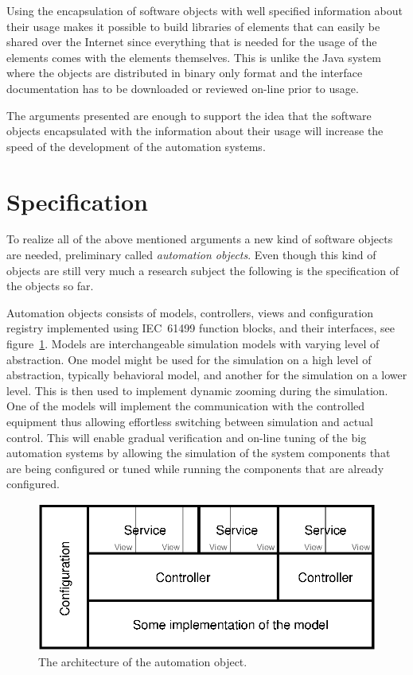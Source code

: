 Using the encapsulation of software objects with well
specified information about their usage makes it possible to
build libraries of elements that can easily be shared over
the Internet since everything that is needed for the usage
of the elements comes with the elements themselves. This is
unlike the Java system where the objects are distributed in
binary only format and the interface documentation has to be
downloaded or reviewed on-line prior to usage.

The arguments presented are enough to support the idea that
the software objects encapsulated with the information about
their usage will increase the speed of the development of
the automation systems.



\section{Specification}
To realize all of the above mentioned arguments a new kind
of software objects are needed, preliminary called
\emph{automation objects}. Even though this kind of objects
are still very much a research subject the following is the
specification of the objects so far.

Automation objects consists of models, controllers, views
and configuration registry implemented using IEC~61499
function blocks, and their interfaces, see
figure~\ref{fig:AO}. Models are interchangeable simulation
models with varying level of abstraction. One model might
be used for the simulation on a high level of abstraction,
typically behavioral model, and another for the simulation
on a lower level. This is then used to implement dynamic
zooming during the simulation. One of the models will
implement the communication with the controlled equipment
thus allowing effortless switching between simulation and
actual control. This will enable gradual verification and
on-line tuning of the big automation systems by allowing the
simulation of the system components that are being
configured or tuned while running the components that are
already configured.
\begin{figure}[!ht]
  \centering
  \includegraphics{images/automationobjects/AO}
  \caption{The architecture of the automation object.}
  \label{fig:AO}
\end{figure}

